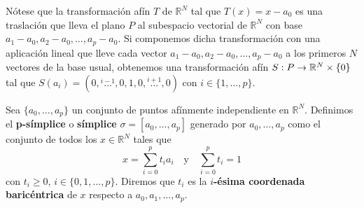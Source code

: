 Nótese que la transformación afín \(T\) de \(\mathbb{R}^{N}\) tal que
\(T(x) = x - a_{0}\) es una traslación que lleva el plano \(P\) al subespacio
vectorial de \(\mathbb{R}^{N}\) con base
\(a_{1}-a_{0}, a_{2}-a_{0}, \ldots, a_{p}-a_{0}\). Si componemos dicha transformación
con una aplicación lineal que lleve cada vector \(a_{1}-a_{0}, a_{2}-a_{0}, \ldots,
a_{p}-a_{0}\) a los primeros \(N\) vectores de la base usual, obtenemos una
transformación afín \(S: P \rightarrow \mathbb{R}^{N}\times \{0\}\) tal que
\(S(a_{i}) = (0, \overset{i-1}{\ldots}, 0, 1, 0, \overset{i+1}{\ldots}, 0)\) con
\(i \in \{1, \ldots, p\}\).

\begin{definicion}
	\label{def:simplex} Sea \(\{a_{0}, \ldots, a_{p}\}\) un conjunto de puntos afínmente
	independiente en \(\mathbb{R}^{N}\). Definimos el \textbf{p-símplice} o \textbf{símplice}
	\(\sigma = [a_{0}, \ldots, a_{p}]\) generado por \(a_{0}, \ldots, a_{p}\) como el
	conjunto de todos los \(x \in \mathbb{R}^{N}\) tales que
	\[
		x=\sum_{i=0}^{p}t_{i}a_{i}\quad \text{y}\quad \sum_{i=0}^{p}t_{i}=1
	\]
	con \(t_{i}\geq 0\), \(i \in \{0, 1, \ldots, p\}\). Diremos que \(t_{i}\) es la
	\textbf{\(i\)-ésima coordenada baricéntrica} de \(x\) respecto a \(a_{0}, a_{1}, \ldots
	, a_{p}\).
\end{definicion}

